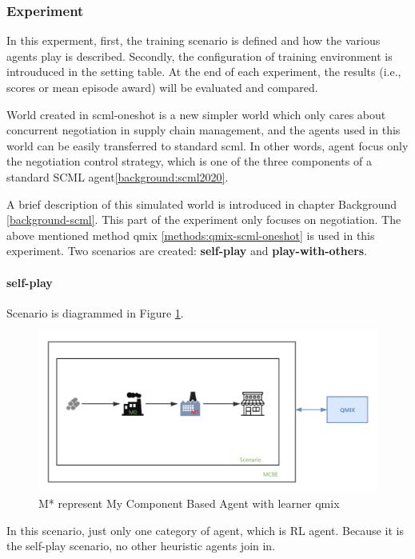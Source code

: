 \subsubsection{Experiment}
In this experment, first, the training scenario is defined and how the various agents play is described. Secondly, the configuration of training environment is introuduced in the setting table. At the end of each experiment, the results (i.e., scores or mean episode award) will be evaluated and compared.

World created in scml-oneshot is a new simpler world which only cares about concurrent negotiation in supply chain management, and the agents used in this world can be easily transferred to standard scml. In other words, agent focus only the negotiation control strategy, which is one of the three components of a standard SCML agent\ref{background:scml2020}.
 
A brief description of this simulated world is introduced in chapter Background \ref{background-scml}. This part of the experiment only focuses on negotiation. The above mentioned method qmix \ref{methods:qmix-scml-oneshot} is used in this experiment. Two scenarios are created: \textbf{self-play} and \textbf{play-with-others}.

\paragraph{self-play}
Scenario is diagrammed in Figure \ref{fig:scenario-oneshot-scml-self-play}.
\begin{figure}[htbp]
\centering
\includegraphics[width=1.0\textwidth]{./images/scenario-oneshot-scml-self-play.png}
\caption{M* represent My Component Based Agent with learner \gls{qmix}}
\label{fig:scenario-oneshot-scml-self-play}
\end{figure}

In this scenario, just only one category of agent, which is RL agent. Because it is the self-play scenario, no other heuristic agents join in.
